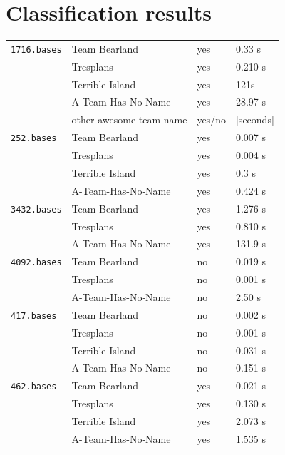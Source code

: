 \documentclass[11pt]{amsart}
\begin{document}
\section{Classification results}

\begin{center}
  \begin{tabular}[c]{llll}
    \hline
    \texttt{1716.bases}
    & Team Bearland
    & yes
    & 0.33 s
    \\
    & Tresplans
    & yes
    & 0.210 s
    \\
    & Terrible Island
    & yes
    & 121s
    \\
    & A-Team-Has-No-Name
    & yes
    & 28.97 s
    \\
    & other-awesome-team-name
    & yes/no
    & [seconds]
    \\\hline
      \texttt{252.bases}
    & Team Bearland
    & yes
    & 0.007 s
    \\
    & Tresplans
    & yes
    & 0.004 s
    \\
    & Terrible Island
    & yes
    & 0.3 s
    \\
    & A-Team-Has-No-Name
    & yes
    & 0.424 s
    \\\hline
      \texttt{3432.bases}
    & Team Bearland
    & yes
    & 1.276 s
    \\
    & Tresplans
    & yes
    & 0.810 s
    \\
    & A-Team-Has-No-Name
    & yes
    & 131.9 s
    \\\hline
      \texttt{4092.bases}
    & Team Bearland
    & no
    & 0.019 s
    \\
    & Tresplans
    & no
    & 0.001 s
    \\
    & A-Team-Has-No-Name
    & no
    & 2.50 s
    \\\hline
      \texttt{417.bases}
    & Team Bearland
    & no
    & 0.002 s
    \\
    & Tresplans
    & no
    & 0.001 s
    \\
    & Terrible Island
    & no
    & 0.031 s
    \\
    & A-Team-Has-No-Name
    & no
    & 0.151 s
    \\\hline
      \texttt{462.bases}
    & Team Bearland
    & yes
    & 0.021 s
    \\
    & Tresplans
    & yes
    & 0.130 s
    \\
    & Terrible Island
    & yes
    & 2.073 s
    \\
    & A-Team-Has-No-Name
    & yes
    & 1.535 s

\end{tabular}
\end{center}
\end{document}
